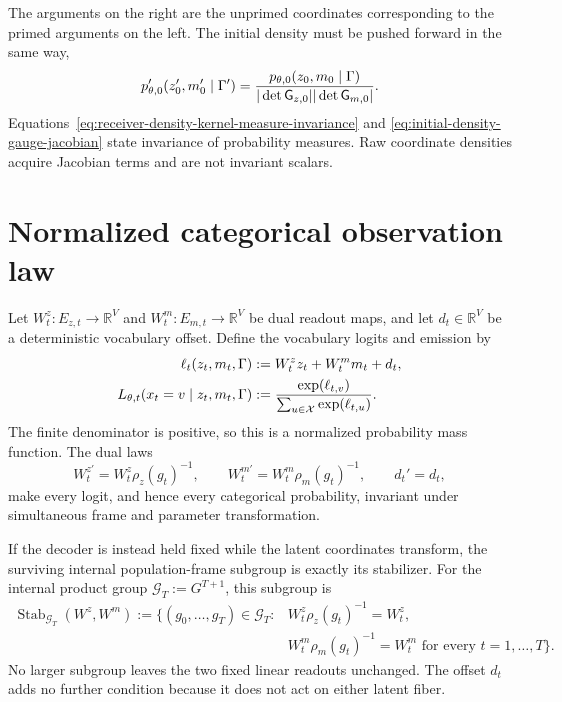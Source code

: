 The arguments on the right are the unprimed coordinates corresponding to the primed arguments on the left.  The initial density must be pushed forward in the same way,
\begin{equation}
p_{\theta,0}'(z_0',m_0'\mid\Gamma')
=\frac{p_{\theta,0}(z_0,m_0\mid\Gamma)}
{|\det\mathsf G_{z,0}||\det\mathsf G_{m,0}|}.
\label{eq:initial-density-gauge-jacobian}
\end{equation}
Equations~\eqref{eq:receiver-density-kernel-measure-invariance} and \eqref{eq:initial-density-gauge-jacobian} state invariance of probability measures.  Raw coordinate densities acquire Jacobian terms and are not invariant scalars.

\section{Normalized categorical observation law}

Let $W_t^z:E_{z,t}\to\mathbb R^V$ and $W_t^m:E_{m,t}\to\mathbb R^V$ be dual readout maps, and let $d_t\in\mathbb R^V$ be a deterministic vocabulary offset.  Define the vocabulary logits and emission by
\begin{equation}
\begin{aligned}
\ell_t(z_t,m_t,\Gamma)
&:=W_t^zz_t+W_t^mm_t+d_t,\\
L_{\theta,t}(x_t=v\mid z_t,m_t,\Gamma)
&:=\frac{\exp(\ell_{t,v})}
{\sum_{u\in\mathcal X}\exp(\ell_{t,u})}.
\end{aligned}
\label{eq:gauge-compatible-categorical-emission}
\end{equation}
The finite denominator is positive, so this is a normalized probability mass function.  The dual laws
\begin{equation}
W_t^{z\prime}=W_t^z\rho_z(g_t)^{-1},
\qquad
W_t^{m\prime}=W_t^m\rho_m(g_t)^{-1},
\qquad
d_t'=d_t,
\label{eq:dual-decoder-gauge-laws}
\end{equation}
make every logit, and hence every categorical probability, invariant under simultaneous frame and parameter transformation.

If the decoder is instead held fixed while the latent coordinates transform, the surviving internal population-frame subgroup is exactly its stabilizer. For the internal product group $\mathcal G_T:=G^{T+1}$, this subgroup is
\begin{equation}
\begin{aligned}
\operatorname{Stab}_{\mathcal G_T}(W^z,W^m)
:=\bigl\{(g_0,\ldots,g_T)\in\mathcal G_T:
&W_t^z\rho_z(g_t)^{-1}=W_t^z,\\
&W_t^m\rho_m(g_t)^{-1}=W_t^m
\text{ for every }t=1,\ldots,T\bigr\}.
\end{aligned}
\label{eq:fixed-decoder-stabilizer}
\end{equation}
No larger subgroup leaves the two fixed linear readouts unchanged.  The offset $d_t$ adds no further condition because it does not act on either latent fiber.

